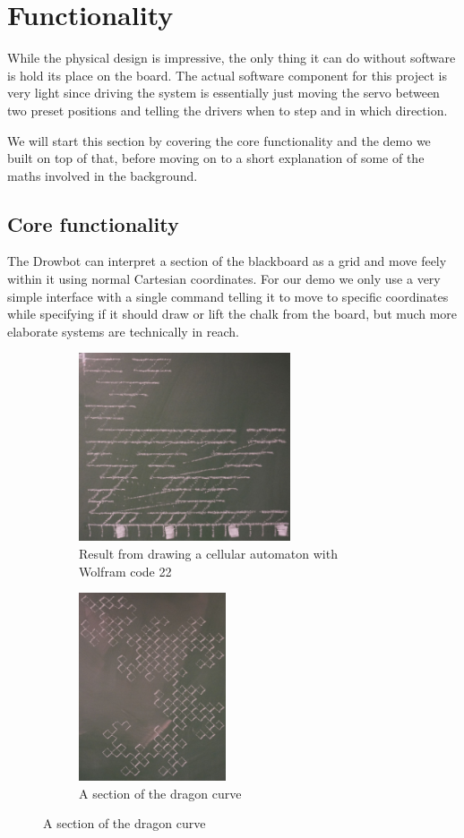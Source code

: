 \documentclass[12pt]{article}
\begin{document}
\section{Functionality}
\label{sec:functionality}
While the physical design is impressive, the only thing it can do
without software is hold its place on the board.
The actual software component for this project is very light since
driving the system is essentially just moving the servo between
two preset positions and telling the drivers when to step and in
which direction.

We will start this section by covering the core functionality and the
demo we built on top of that, before moving on to a short explanation
of some of the maths involved in the background.

\subsection{Core functionality}
The Drowbot can interpret a section of the blackboard as a grid
and move feely within it using normal Cartesian coordinates.
For our demo we only use a very simple interface with a single
command telling it to move to specific coordinates while specifying
if it should draw or lift the chalk from the board, but much more
elaborate systems are technically in reach.

\begin{figure}
  \centering
  \begin{subfigure}[t]{0.55\textwidth}
    \centering
    \includegraphics[height=15em]{img/ca_res.jpg}
    \caption{Result from drawing a cellular automaton with Wolfram code 22}
    \label{fig:ca_res}
  \end{subfigure}
  \begin{subfigure}[t]{0.4\textwidth}
    \centering
    \includegraphics[height=15em]{img/dragon_curve.jpg}
    \caption{A section of the dragon curve}
    \label{fig:drag_curve}
  \end{subfigure}
\end{figure}
\end{document}
